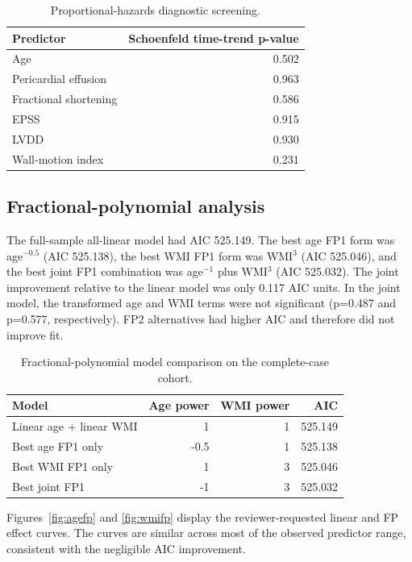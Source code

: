 \documentclass[a4paper,12pt]{article}
\begin{document}
\begin{table}[H]
\centering
\caption{Proportional-hazards diagnostic screening.}
\label{tab:ph}
\begin{tabular}{lr}
\toprule
Predictor & Schoenfeld time-trend p-value \\
\midrule
Age & 0.502 \\
Pericardial effusion & 0.963 \\
Fractional shortening & 0.586 \\
EPSS & 0.915 \\
LVDD & 0.930 \\
Wall-motion index & 0.231 \\
\bottomrule
\end{tabular}
\end{table}

\subsection{Fractional-polynomial analysis}
The full-sample all-linear model had AIC 525.149. The best age FP1 form was age$^{-0.5}$ (AIC 525.138), the best WMI FP1 form was WMI$^3$ (AIC 525.046), and the best joint FP1 combination was age$^{-1}$ plus WMI$^3$ (AIC 525.032). The joint improvement relative to the linear model was only 0.117 AIC units. In the joint model, the transformed age and WMI terms were not significant (p=0.487 and p=0.577, respectively). FP2 alternatives had higher AIC and therefore did not improve fit.

\begin{table}[H]
\centering
\caption{Fractional-polynomial model comparison on the complete-case cohort.}
\label{tab:fp}
\begin{tabular}{lrrr}
\toprule
Model & Age power & WMI power & AIC \\
\midrule
Linear age + linear WMI & 1 & 1 & 525.149 \\
Best age FP1 only & -0.5 & 1 & 525.138 \\
Best WMI FP1 only & 1 & 3 & 525.046 \\
Best joint FP1 & -1 & 3 & 525.032 \\
\bottomrule
\end{tabular}
\end{table}

Figures~\ref{fig:agefp} and \ref{fig:wmifp} display the reviewer-requested linear and FP effect curves. The curves are similar across most of the observed predictor range, consistent with the negligible AIC improvement.
\end{document}

